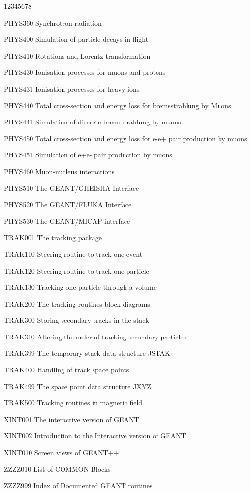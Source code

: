 \begin{DLtt}{12345678}
\item[PHYS360] Synchrotron radiation
\item[PHYS400] Simulation of particle decays in flight
\item[PHYS410] Rotations and Lorentz transformation
\item[PHYS430] Ionisation processes for muons and protons
\item[PHYS431] Ionisation processes for heavy ions
\item[PHYS440] Total cross-section and energy loss for bremsstrahlung by Muons
\item[PHYS441] Simulation of discrete bremsstrahlung by muons
\item[PHYS450] Total cross-section and energy loss for e-e+ pair production by muons
\item[PHYS451] Simulation of e+e- pair production by muons
\item[PHYS460] Muon-nucleus interactions
\item[PHYS510] The GEANT/GHEISHA Interface
\item[PHYS520] The GEANT/FLUKA Interface
\item[PHYS530] The GEANT/MICAP interface
\item[TRAK001] The tracking package
\item[TRAK110] Steering routine to track one event
\item[TRAK120] Steering routine to track one particle
\item[TRAK130] Tracking one particle through a volume
\item[TRAK200] The tracking routines block diagrams
\item[TRAK300] Storing secondary tracks in the stack
\item[TRAK310] Altering the order of tracking secondary particles
\item[TRAK399] The temporary stack data structure JSTAK
\item[TRAK400] Handling of track space points
\item[TRAK499] The space point data structure JXYZ
\item[TRAK500] Tracking routines in magnetic field
\item[XINT001] The interactive version of GEANT
\item[XINT002] Introduction to the Interactive version of GEANT
\item[XINT010] Screen views of GEANT++
\item[ZZZZ010] List of COMMON Blocks
\item[ZZZZ999] Index of Documented GEANT routines
\end{DLtt}
